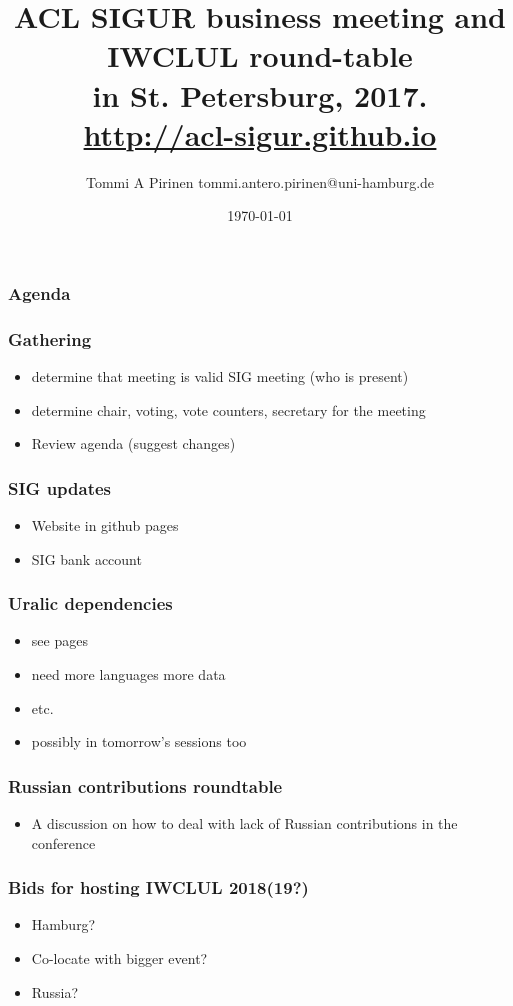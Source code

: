\documentclass{beamer}
\title{ACL SIGUR business meeting and IWCLUL round-table\\
\scriptsize{in St. Petersburg, 2017.\\
\url{http://acl-sigur.github.io}}}
\author{Tommi A Pirinen \scriptsize \guilsinglleft
tommi.antero.pirinen@uni-hamburg.de \guilsinglright }
\institute{UHH, HZSK}
\date{\today}
\makeatletter
\newcommand\listofframes{\@starttoc{lbf}}
\makeatother
\begin{document}

\maketitle

\begin{frame}
    \frametitle{Agenda}
    \listofframes
\end{frame}

\begin{frame}
    \frametitle{Gathering}
    \begin{itemize}
        \item determine that meeting is valid SIG meeting (who is present)
        \item determine chair, voting, vote counters, secretary for the meeting
        \item Review agenda (suggest changes)
    \end{itemize}
\end{frame}

\begin{frame}
    \frametitle{SIG updates}
    \begin{itemize}
        \item Website in github pages
        \item SIG bank account
    \end{itemize}
\end{frame}

\begin{frame}
    \frametitle{Uralic dependencies}
    \begin{itemize}
        \item see pages
        \item need more languages more data
        \item etc.
        \item possibly in tomorrow's sessions too
    \end{itemize}
\end{frame}

\begin{frame}
    \frametitle{Russian contributions roundtable}
    \begin{itemize}
        \item A discussion on how to deal with lack of Russian contributions in
            the conference
    \end{itemize}
\end{frame}

\begin{frame}
    \frametitle{Bids for hosting IWCLUL 2018(19?)}
    \begin{itemize}
        \item Hamburg?
        \item Co-locate with bigger event?
        \item Russia?
    \end{itemize}
\end{frame}
\end{document}
